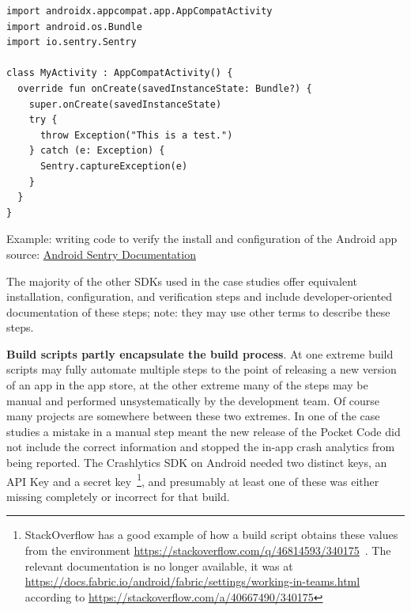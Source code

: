 \begin{listing}
\begin{verbatim}
import androidx.appcompat.app.AppCompatActivity
import android.os.Bundle
import io.sentry.Sentry

class MyActivity : AppCompatActivity() {
  override fun onCreate(savedInstanceState: Bundle?) {
    super.onCreate(savedInstanceState)
    try {
      throw Exception("This is a test.")
    } catch (e: Exception) {
      Sentry.captureException(e)
    }
  }
}
\end{verbatim}
\caption{Example: writing code to verify the install and configuration of the Android app\\ source: \href{https://docs.sentry.io/platforms/android/}{Android Sentry Documentation}}
\label{listing:android_activity_to_verify_sentry_works_in_app}
\end{listing}

The majority of the other SDKs used in the case studies offer equivalent installation, configuration, and verification steps and include developer-oriented documentation of these steps; note: they may use other terms to describe these steps.

\textbf{Build scripts partly encapsulate the build process}.  
At one extreme build scripts may fully automate multiple steps to the point of releasing a new version of an app in the app store, at the other extreme many of the steps may be manual and performed unsystematically by the development team. Of course many projects are somewhere between these two extremes. In one of the case studies a mistake in a manual step meant the new release of the Pocket Code did not include the correct information and stopped the in-app crash analytics from being reported. The Crashlytics SDK on Android needed two distinct keys, an API Key and a secret key~\footnote{StackOverflow has a good example of how a build script obtains these values from the environment \url{https://stackoverflow.com/q/46814593/340175}~\citep{scott2017_android_app_crash_noclassdeffounderror_on_samsung_lollipop_devices}. The relevant documentation is no longer available, it was at \url{https://docs.fabric.io/android/fabric/settings/working-in-teams.html} according to \url{https://stackoverflow.com/a/40667490/340175}}, and presumably at least one of these was either missing completely or incorrect for that build.

